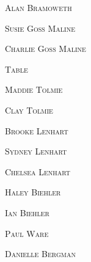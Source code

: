 \documentclass[12pt]{article}
\begin{document}
\vspace*{.15in}
\textsc{\Huge Alan Bramoweth}

\vspace*{.15in}
\textsc{\Huge Susie Goss Maline}

\vspace*{.15in}
\textsc{\Huge Charlie Goss Maline}


\vspace*{\fill}

\newpage

\vspace*{.25in}

\textsc{\Huge Table}
\vspace*{.3in}


\vspace*{\fill}

\textsc{\Huge Maddie Tolmie}

\vspace*{.15in}
\textsc{\Huge Clay Tolmie}

\vspace*{.15in}
\textsc{\Huge Brooke Lenhart}

\vspace*{.15in}
\textsc{\Huge Sydney Lenhart}

\vspace*{.15in}
\textsc{\Huge Chelsea Lenhart}

\vspace*{.15in}
\textsc{\Huge Haley Biehler}

\vspace*{.15in}
\textsc{\Huge Ian Biehler}

\vspace*{.15in}
\textsc{\Huge Paul Ware}

\vspace*{.15in}
\textsc{\Huge Danielle Bergman}

\vspace*{\fill}

\newpage

\vspace*{.25in}
\end{document}
